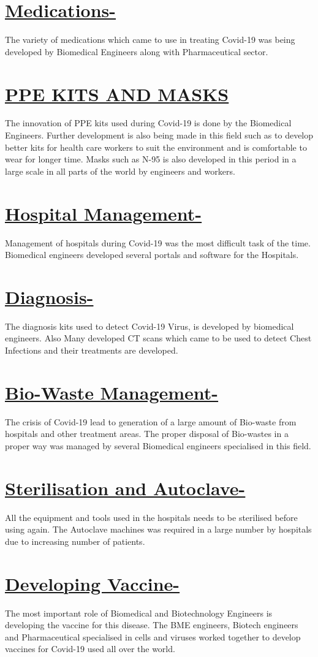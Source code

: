 \documentclass[18pt]{article}
\begin{document}
\section{\underline{Medications-}}
The variety of medications which came to use in treating Covid-19 was being developed by Biomedical Engineers along with Pharmaceutical sector.
\section{\underline{PPE KITS AND MASKS}}
The innovation of PPE kits used during Covid-19 is done by the Biomedical Engineers. Further development is also being made in this field such as to develop better kits for health care workers to suit the environment and is comfortable to wear for longer time. Masks such as N-95 is also developed in this period in a large scale in all parts of the world by engineers and workers.

\section{\underline{Hospital Management- }}
Management of hospitals during Covid-19 was the most difficult task of the time. Biomedical engineers developed several portals and software for the Hospitals.
\section{\underline{Diagnosis- }}
The diagnosis kits used to detect Covid-19 Virus, is developed by biomedical engineers. Also Many developed CT scans which came to be used to detect Chest Infections and their treatments are developed.
\section{\underline{Bio-Waste Management-}}
The crisis of Covid-19 lead to generation of a large amount of Bio-waste from hospitals and other treatment areas. The proper disposal of Bio-wastes in a proper way was managed by several Biomedical engineers specialised in this field. 
\section{\underline{Sterilisation and Autoclave-}}
All the equipment and tools used in the hospitals needs to be sterilised before using again. The Autoclave machines was required in a large number by hospitals due to increasing number of patients.
\section{\underline{Developing Vaccine- }}
The most important role of Biomedical and Biotechnology Engineers is developing the vaccine for this disease. The BME engineers, Biotech engineers and Pharmaceutical specialised in cells and viruses worked together to develop vaccines for Covid-19 used all over the world.
\end{document}
